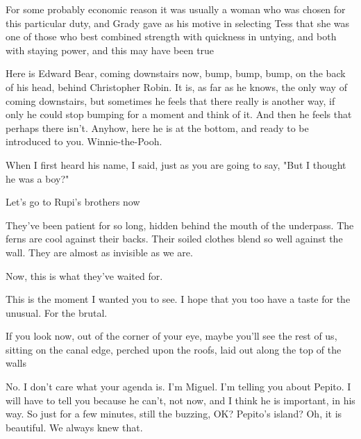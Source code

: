 \documentclass[11pt]{article}
\newenvironment{narrow}[2]{%
 \begin{list}{}{%
  \setlength{\topsep}{0pt}%
  \setlength{\leftmargin}{#1}%
  \setlength{\rightmargin}{#2}%
  \setlength{\listparindent}{\parindent}%
  \setlength{\itemindent}{\parindent}%
  \setlength{\parsep}{\parskip}%
 }%
\item[]}{\end{list}}
\begin{document}
\begin{enumerate}
\begin{narrow}{1.0cm}{1.0cm}
\end{narrow}

\item 
\begin{narrow}{1.0cm}{1.0cm}
For some probably economic reason it was usually a woman who was chosen for 
this particular duty, and Grady gave as his motive in selecting Tess that she 
was one of those who best combined strength with quickness in untying, and 
both with staying power, and this may have been true
\end{narrow}

\item 
\begin{narrow}{1.0cm}{1.0cm}

Here is Edward Bear, coming downstairs now, bump, bump, bump, on the back of 
his head, behind Christopher Robin. It is, as far as he knows, the only way 
of coming downstairs, but sometimes he feels that there really is another way,
 if only he could stop bumping for a moment and think of it. And then he 
feels that perhaps there isn't. Anyhow, here he is at the bottom, and ready 
to be introduced to you. Winnie-the-Pooh.

When I first heard his name, I said, just as you are going to say, "But I 
thought he was a boy?"
\end{narrow} 

\item 
\begin{narrow}{1.0cm}{1.0cm}
Let's go to Rupi's brothers now

They've been patient for so long, hidden behind the mouth of the underpass. 
The ferns are cool against their backs. Their soiled clothes blend so well 
against the wall. They are almost as invisible as we are.

Now, this is what they've waited for.

This is the moment I wanted you to see. I hope that you too have a taste for 
the unusual. For the brutal.

If you look now, out of the corner of your eye, maybe you'll see the rest of 
us, sitting on the canal edge, perched upon the roofs, laid out along the top 
of the walls
\end{narrow}

\item 
\begin{narrow}{1.0cm}{1.0cm}
No. I don't care what your agenda is. I'm Miguel. I'm telling you about Pepito. I will have to tell you because he can't, not now, and I think he is important, in his way. So just for a few minutes, still the buzzing, OK?
Pepito's island? Oh, it is beautiful. We always knew that.
\end{narrow}



\end{enumerate}
\end{document}
